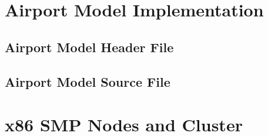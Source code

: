 \documentclass[11pt]{book}
\begin{document}
\appendix

\chapter{Airport Model Implementation}\label{airport_model}

\section{Airport Model Header File}



\section{Airport Model Source File}



\chapter{x86 SMP Nodes and Cluster}\label{x86_nodes_and_clusters}
\end{document}
